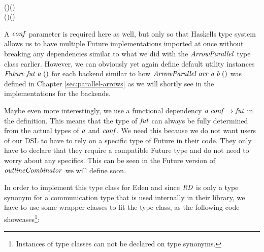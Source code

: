 \documentclass[paper=A4,twoside=true,openright,parskip=full,chapterprefix=true,headings=normal,bibliography=totoc,listof=totoc,titlepage=on,captions=tableabove,draft=false,british]{scrreprt}%
\begin{document}
\begin{hscode}\SaveRestoreHook
{}%
%
%
\>[B]{}\;\;\;\;\mid {}\;\to {}\;\<[E]%
\\
\>[B]{}\<[5]%
\>[5]{}\mathbin{::}(\;)\Rightarrow {}\to {}\;\;(\;){}\<[E]%
\\
\>[B]{}\<[5]%
\>[5]{}\mathbin{::}(\;)\Rightarrow {}\to {}\;(\;)\;\<[E]%
\ColumnHook
\end{hscode}\resethooks
\vspace{-2\baselineskip}

A \ensuremath{\Varid{conf}} parameter is required here as well, but only so that Haskells
type system allows us to have multiple Future implementations imported
at once without breaking any dependencies similar to what we did with
the \ensuremath{\Conid{ArrowParallel}} type class earlier. However, we can obviously yet
again define default utility instances \ensuremath{\Conid{Future}\;\Varid{fut}\;\Varid{a}\;()} for each
backend similar to how \ensuremath{\Conid{ArrowParallel}\;\Varid{arr}\;\Varid{a}\;\Varid{b}\;()} was defined in Chapter
\ref{sec:parallel-arrows} as we will shortly see in the implementations
for the backends.

Maybe even more interestingly, we use a functional dependency
\ensuremath{\Varid{a}\;\Varid{conf}\to \Varid{fut}} in the definition. This means that the type of \ensuremath{\Varid{fut}} can
always be fully determined from the actual types of \ensuremath{\Varid{a}} and \ensuremath{\Varid{conf}}. We
need this because we do not want users of our DSL to have to rely on a
specific type of Future in their code. They only have to declare that
they require a compatible Future type and do not need to worry about any
specifics. This can be seen in the Future version of \ensuremath{\Varid{outlineCombinator}}
we will define soon.

In order to implement this type class for Eden and since \ensuremath{\Conid{RD}} is only a
type synonym for a communication type that is used internally in their
library, we have to use some wrapper classes to fit the type class, as
the following code showcases\footnote{Instances of type classes can not
  be declared on type synonyms.}:
\end{document}
